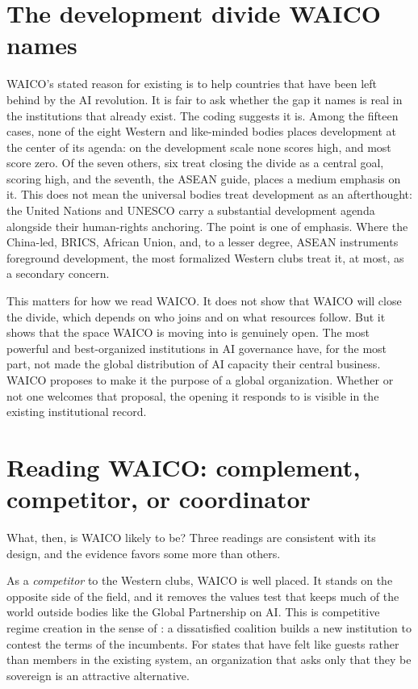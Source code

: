 \documentclass[11pt]{article}
\begin{document}
\section{The development divide WAICO names}
WAICO's stated reason for existing is to help countries that have been left behind by the AI revolution. It is fair to ask whether the gap it names is real in the institutions that already exist. The coding suggests it is. Among the fifteen cases, none of the eight Western and like-minded bodies places development at the center of its agenda: on the development scale none scores high, and most score zero. Of the seven others, six treat closing the divide as a central goal, scoring high, and the seventh, the ASEAN guide, places a medium emphasis on it. This does not mean the universal bodies treat development as an afterthought: the United Nations and UNESCO carry a substantial development agenda alongside their human-rights anchoring. The point is one of emphasis. Where the China-led, BRICS, African Union, and, to a lesser degree, ASEAN instruments foreground development, the most formalized Western clubs treat it, at most, as a secondary concern.

This matters for how we read WAICO. It does not show that WAICO will close the divide, which depends on who joins and on what resources follow. But it shows that the space WAICO is moving into is genuinely open. The most powerful and best-organized institutions in AI governance have, for the most part, not made the global distribution of AI capacity their central business. WAICO proposes to make it the purpose of a global organization. Whether or not one welcomes that proposal, the opening it responds to is visible in the existing institutional record.

\section{Reading WAICO: complement, competitor, or coordinator}
What, then, is WAICO likely to be? Three readings are consistent with its design, and the evidence favors some more than others.

As a \emph{competitor} to the Western clubs, WAICO is well placed. It stands on the opposite side of the field, and it removes the values test that keeps much of the world outside bodies like the Global Partnership on AI. This is competitive regime creation in the sense of \citet{morse2014contested}: a dissatisfied coalition builds a new institution to contest the terms of the incumbents. For states that have felt like guests rather than members in the existing system, an organization that asks only that they be sovereign is an attractive alternative.
\end{document}

